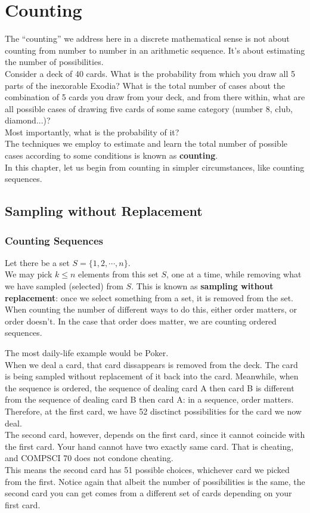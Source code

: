 \chapter{Counting}

The ``counting'' we address here in a discrete mathematical sense is not about counting from number to number in an arithmetic sequence. It's about estimating the number of possibilities. \\
Consider a deck of 40 cards. What is the probability from which you draw all 5 parts of the inexorable Exodia? What is the total number of cases about the combination of 5 cards you draw from your deck, and from there within, what are all possible cases of drawing five cards of some same category (number 8, club, diamond...)? \\
Most importantly, what is the probability of it? \\
The techniques we employ to estimate and learn the total number of possible cases according to some conditions is known as \textbf{counting}. \\
In this chapter, let us begin from counting in simpler circumstances, like counting sequences.

\section{Sampling without Replacement}
\subsection{Counting Sequences}
Let there be a set $S = \{1, 2, \cdots, n\}$. \\
We may pick $k \leq n$ elements from this set $S$, one at a time, while removing what we have sampled (selected) from $S$. This is known as \textbf{sampling without replacement}: once we select something from a set, it is removed from the set. \\
When counting the number of different ways to do this, either order matters, or order doesn't. In the case that order does matter, we are counting ordered sequences.

The most daily-life example would be Poker. \\
When we deal a card, that card dissappears is removed from the deck. The card is being sampled without replacement of it back into the card.
Meanwhile, when the sequence is ordered, the sequence of dealing card A then card B is different from the sequence of dealing card B then card A: in a sequence, order matters. \\
Therefore, at the first card, we have 52 disctinct possibilities for the card we now deal. \\
The second card, however, depends on the first card, since it cannot coincide with the first card. Your hand cannot have two exactly same card. That is cheating, and COMPSCI 70 does not condone cheating. \\
This means the second card has 51 possible choices, whichever card we picked from the first. Notice again that albeit the number of possibilities is the same, the second card you can get comes from a different set of cards depending on your first card.

